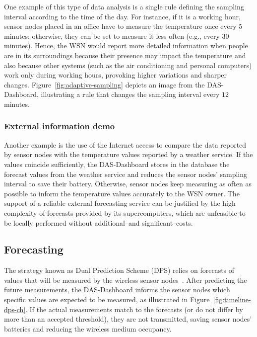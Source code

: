 \documentclass[conference, letterpaper]{IEEEtran}
\newcommand{\dashboard}[1]{DAS-Dashboard}
\begin{document}
One example of this type of data analysis is a single rule defining the sampling interval according to the time of the day. For instance, if it is a working hour, sensor nodes placed in an office have to measure the temperature once every $5$ minutes; otherwise, they can be set to measure it less often (e.g., every $30$ minutes). Hence, the WSN would report more detailed information when people are in its surroundings because their presence may impact the temperature and also because other systems (such as the air conditioning and personal computers) work only during working hours, provoking higher variations and sharper changes. Figure~\ref{fig:adaptive-sampling} depicts an image from the \dashboard{}, illustrating a rule that changes the sampling interval every $12$ minutes.

\subsubsection{External information demo}

Another example is the use of the Internet access to compare the data reported by sensor nodes with the temperature values reported by a weather service. If the values coincide sufficiently, the \dashboard{} stores in the database the forecast values from the weather service and reduces the sensor nodes' sampling interval to save their battery. Otherwise, sensor nodes keep measuring as often as possible to inform the temperature values accurately to the WSN owner. The support of a reliable external forecasting service can be justified by the high complexity of forecasts provided by its supercomputers, which are unfeasible to be locally performed without additional--and significant--costs.

\subsection{Forecasting}

The strategy known as Dual Prediction Scheme (DPS) relies on forecasts of values that will be measured by the wireless sensor nodes~\cite{Dias2016b}. After predicting the future measurements, the \dashboard{} informs the sensor nodes which specific values are expected to be measured, as illustrated in Figure~\ref{fig:timeline-dps-ch}. If the actual measurements match to the forecasts (or do not differ by more than an accepted threshold), they are not transmitted, saving sensor nodes' batteries and reducing the wireless medium occupancy.
\end{document}

